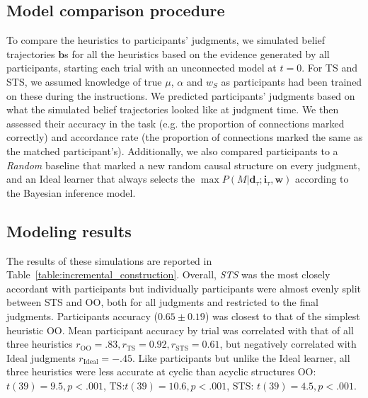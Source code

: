\documentclass[10pt,letterpaper]{article}
\newcommand{\ww}{\mathbf{w}} %
\newcommand{\ws}{w_S} %
\newcommand{\ci}{\mathbf{i}} %
\newcommand{\da}{\mathbf{d}} %
\begin{document}
\subsection{Model comparison procedure}

To compare the heuristics to participants' judgments, we simulated belief trajectories $\textbf{b}$s for all the heuristics based on the evidence generated by all participants, starting each trial with an unconnected model at $t=0$.  For TS and STS, we assumed knowledge of true $\mu$, $\alpha$ and $\ws$ as participants had been trained on these during the instructions. We predicted participants' judgments based on what the simulated belief trajectories looked like at judgment time. 
We then assessed their accuracy in the task (e.g. the proportion of connections marked correctly) and accordance rate (the proportion of connections marked the same as the matched participant's).  Additionally, we also compared participants to a \emph{Random} baseline that marked a new random causal structure on every judgment, and an Ideal learner that always selects the $\max P(M|\da_\tau;\ci_\tau, \ww)$ according to the Bayesian inference model.     

\subsection{Modeling results}

The results of these simulations are reported in Table~\ref{table:incremental_construction}.  Overall, \emph{STS} was the most closely accordant with participants but individually participants were almost evenly split between STS and OO, both for all judgments and restricted to the final judgments. 
Participants accuracy ($0.65\pm0.19$) was closest to that of the simplest heuristic OO.  Mean participant accuracy by trial was correlated with that of all three heuristics $r_{\mathrm{OO}}=.83, r_{\mathrm{TS}}=0.92, r_{\mathrm{STS}}=0.61$, but negatively correlated with Ideal judgments $r_{\mathrm{Ideal}}=-.45$. 
Like participants but unlike the Ideal learner, all three heuristics were less accurate at cyclic than acyclic structures OO: $t(39)=9.5, p<.001$, TS:$t(39)=10.6, p<.001$, STS: $t(39)=4.5, p<.001$.
\end{document}
